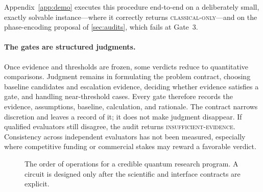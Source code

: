 Appendix~\ref{app:demo} executes this procedure end-to-end on a deliberately small, exactly solvable instance---where it correctly returns \textsc{classical-only}---and on the phase-encoding proposal of \cref{sec:audits}, which fails at Gate~3.

\paragraph{The gates are structured judgments.} Once evidence and thresholds are frozen, some verdicts reduce to quantitative comparisons. Judgment remains in formulating the problem contract, choosing baseline candidates and escalation evidence, deciding whether evidence satisfies a gate, and handling near-threshold cases. Every gate therefore records the evidence, assumptions, baseline, calculation, and rationale. The contract narrows discretion and leaves a record of it; it does not make judgment disappear. If qualified evaluators still disagree, the audit returns \textsc{insufficient-evidence}. Consistency across independent evaluators has not been measured, especially where competitive funding or commercial stakes may reward a favorable verdict.

\begin{figure}[htbp]
\centering
{}
\caption{The order of operations for a credible quantum research program. A circuit is designed only after the scientific and interface contracts are explicit.}
\label{fig:order}
\end{figure}

